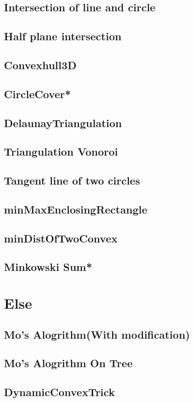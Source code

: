 \subsection{Intersection of line and circle}

\subsection{Half plane intersection}

\subsection{Convexhull3D}

\subsection{CircleCover*} %

\subsection{DelaunayTriangulation}

\subsection{Triangulation Vonoroi}

\subsection{Tangent line of two circles}

\subsection{minMaxEnclosingRectangle}

\subsection{minDistOfTwoConvex}

\subsection{Minkowski Sum*} %



\section{Else}
\subsection{Mo's Alogrithm(With modification)}

\subsection{Mo's Alogrithm On Tree}

\subsection{DynamicConvexTrick}


